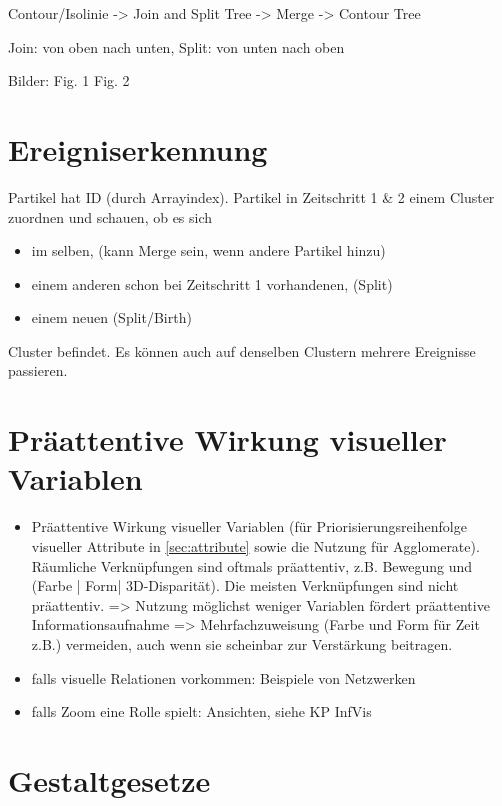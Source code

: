 Contour/Isolinie -> Join and Split Tree -> Merge -> Contour Tree \cite[S.~1]{carr2001computingCountourTrees}

Join: von oben nach unten, Split: von unten nach oben \cite{carr2001computingCountourTrees_web}

Bilder:
\cite[S.~1]{chiang2005contourTreesUsingMonotonePaths} Fig. 1
\cite[S.~44]{carr2010flexibleIsosurfaces} Fig. 2


\section{Ereigniserkennung}
Partikel hat ID (durch Arrayindex). Partikel in Zeitschritt 1 \& 2 einem Cluster zuordnen und schauen, ob es sich
\begin{itemize}
	\item im selben, (kann Merge sein, wenn andere Partikel hinzu)
	\item einem anderen schon bei Zeitschritt 1 vorhandenen, (Split)
	\item einem neuen (Split/Birth)
\end{itemize}
Cluster befindet. Es können auch auf denselben Clustern mehrere Ereignisse passieren.

\section{Präattentive Wirkung visueller Variablen}

\begin{itemize}
	\item Präattentive Wirkung visueller Variablen (für Priorisierungsreihenfolge visueller Attribute in \autoref{sec:attribute} sowie die Nutzung für Agglomerate). Räumliche Verknüpfungen sind oftmals präattentiv, z.B. Bewegung und (Farbe | Form| 3D-Disparität). Die meisten Verknüpfungen sind nicht präattentiv. => Nutzung möglichst weniger Variablen fördert präattentive Informationsaufnahme =>  Mehrfachzuweisung (Farbe und Form für Zeit z.B.) vermeiden, auch wenn sie scheinbar zur Verstärkung beitragen.
	\item falls visuelle Relationen vorkommen: Beispiele von Netzwerken
	\item falls Zoom eine Rolle spielt: Ansichten, siehe KP InfVis
\end{itemize}

\section{Gestaltgesetze}\label{sec:gestaltgesetze}

